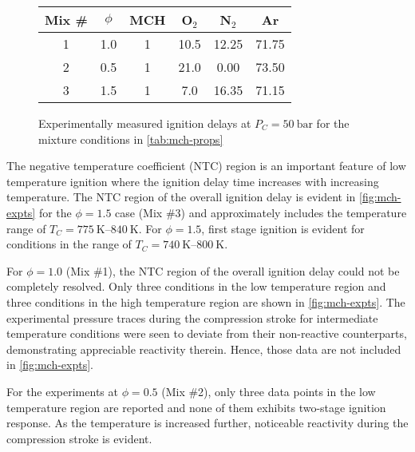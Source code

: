 \documentclass[12pt, letterpaper]{article}
\begin{document}
\begin{figure}\CenterFloatBoxes
    \begin{floatrow}
        \killfloatstyle{}
            {\begin{tabular}{*{6}{S}}
            \toprule
            {Mix \#} & {$\phi$} & {MCH} & {O$_2$} & {N$_2$} & {Ar} \\
             & 1.0 & 1 & 10.5 & 12.25 & 71.75 \\
            2 & 0.5 & 1 & 21.0 &  0.00 & 73.50 \\
            3 & 1.5 & 1 &  7.0 & 16.35 & 71.15 \\
            \bottomrule
            \end{tabular}
            }
            {\caption{Experimentally measured ignition delays at $P_C=\SI{50}{\bar}$ for the
                mixture conditions in \autoref{tab:mch-props}}
            \label{fig:mch-expts}}
    \end{floatrow}
\end{figure}

The negative temperature coefficient (NTC) region is an important feature of
low temperature ignition where the ignition delay time increases with
increasing temperature. The NTC region of the overall ignition delay is
evident in \autoref{fig:mch-expts} for the $\phi=\num{1.5}$ case (Mix \#3) and
approximately includes the temperature range of $T_C=\SIrange{775}{840}{\kelvin}$. For
$\phi=\num{1.5}$, first stage ignition is evident for conditions in the range of
$T_C=\SIrange{740}{800}{\kelvin}$.

For $\phi=\num{1.0}$ (Mix \#1), the NTC region of the overall ignition delay could
not be completely resolved. Only three conditions in the low temperature region
and three conditions in the high temperature region are shown in
\autoref{fig:mch-expts}. The experimental pressure traces during the compression
stroke for intermediate temperature conditions were seen to deviate from their
non-reactive counterparts, demonstrating appreciable reactivity therein. Hence,
those data are not included in \autoref{fig:mch-expts}.

For the experiments at $\phi=\num{0.5}$ (Mix \#2), only three data points in the low
temperature region are reported and none of them exhibits two-stage ignition
response. As the temperature is increased further, noticeable reactivity during
the compression stroke is evident.
\end{document}

